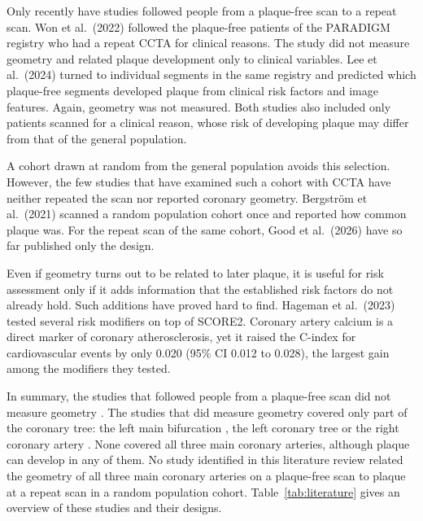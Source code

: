 Only recently have studies followed people from a plaque-free scan to a repeat scan.
Won et al.\ (2022) \cite{won2022paradigm} followed the plaque-free patients of the PARADIGM
registry who had a repeat CCTA for clinical reasons.
The study did not measure geometry and related plaque development only to clinical variables.
Lee et al.\ (2024) \cite{lee2024radiomics} turned to individual segments in the same registry and
predicted which plaque-free segments developed plaque from clinical risk factors and image features.
Again, geometry was not measured.
Both studies also included only patients scanned for a clinical reason, whose risk of developing
plaque may differ from that of the general population.

A cohort drawn at random from the general population avoids this selection.
However, the few studies that have examined such a cohort with CCTA have neither repeated the scan
nor reported coronary geometry.
Bergstr\"om et al.\ (2021) \cite{bergstrom2021scapis} scanned a random population cohort once and
reported how common plaque was.
For the repeat scan of the same cohort, Good et al.\ (2026) \cite{good2026scapis} have so far
published only the design.

Even if geometry turns out to be related to later plaque, it is useful for risk assessment only if
it adds information that the established risk factors do not already hold.
Such additions have proved hard to find.
Hageman et al.\ (2023) \cite{hageman2023score2} tested several risk modifiers on top of SCORE2.
Coronary artery calcium is a direct marker of coronary atherosclerosis, yet it raised the C-index
for cardiovascular events by only 0.020 (95\% CI 0.012 to 0.028), the largest gain among the
modifiers they tested.

In summary, the studies that followed people from a plaque-free scan did not measure geometry
\cite{won2022paradigm,lee2024radiomics}.
The studies that did measure geometry covered only part of the coronary tree: the left main
bifurcation \cite{kashyap2022tortuosity,tommasino2024clap}, the left coronary tree
\cite{zhang2024curvature,garcha2025sensitivity} or the right coronary artery
\cite{telloayala2026tortuosity}.
None covered all three main coronary arteries, although plaque can develop in any of them.
No study identified in this literature review related the geometry of all three main coronary
arteries on a plaque-free scan to plaque at a repeat scan in a random population cohort.
Table~\ref{tab:literature} gives an overview of these studies and their designs.

